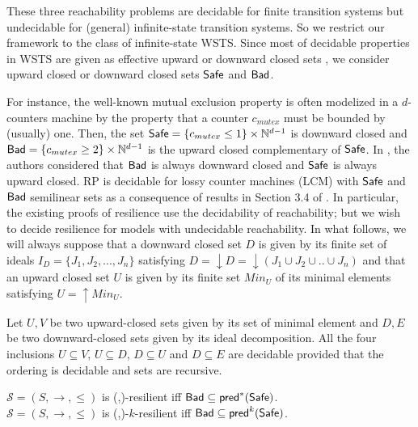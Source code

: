 These three reachability problems are decidable for finite transition systems but undecidable for (general) infinite-state transition systems. 
So we restrict our framework to the class of infinite-state WSTS. Since most of decidable properties in WSTS are given as effective upward or downward closed sets \cite{DBLP:journals/iandc/AbdullaCJT00, DBLP:journals/tcs/FinkelS01}, we consider upward closed or downward closed sets $\textsf{Safe}$ and $\textsf{Bad}$.

For instance, the well-known mutual exclusion property is often modelized in a $d$-counters machine by the property that a counter $c_{mutex}$ must be bounded by (usually) one. Then, the set $\textsf{Safe} =  \{c_{mutex} \leq 1\} \times \mathbb{N}^{d-1}$ is downward closed and $\textsf{Bad} =\{c_{mutex} \geq 2\} \times  \mathbb{N}^{d-1} $ is the upward closed complementary of $\textsf{Safe}$. In \cite{DBLP:conf/gg/Ozkan22}, the authors considered that $\textsf{Bad}$ is always downward closed and $\textsf{Safe}$ is always upward closed.
%		
RP is decidable for lossy counter machines (LCM) with $\textsf{Safe}$ and $\textsf{Bad}$ semilinear sets as a consequence of results in Section 3.4 of \cite{DBLP:conf/rp/Schnoebelen10}. In particular, the existing proofs of resilience use the decidability of reachability; but we wish to decide resilience for models with undecidable reachability.
%
In what follows, we will always suppose that a downward closed set $D$ is given by its finite set of ideals $I_D=\{J_1, J_2,...,J_n\}$ satisfying $D=\downarrow D = \downarrow (J_1 \cup J_2 \cup..\cup J_n)$ and that an upward closed set $U$ is given by its finite set $Min_U$ of its minimal elements satisfying $U=\uparrow Min_U$.

Let $U,V$ be two upward-closed sets given by its set of minimal element and $D,E$ be two downward-closed sets given by its ideal decomposition. All the four  inclusions $U \subseteq V$,  $U \subseteq D$, $D \subseteq U$ and $D \subseteq E$ are decidable provided that the ordering is decidable and sets are recursive.


\begin{proposition}[Reformulation]\label{reformulation}
$\mathscr{S}=(S,\rightarrow,\leq)$ is %
(\Bad,\Safe)-resilient iff $\textsf{Bad} \subseteq \textsf{pred}^*(\textsf{Safe})$.\\
$\mathscr{S}=(S,\rightarrow,\leq)$ is %
(\Bad,\Safe)-$k$-resilient iff $\textsf{Bad} \subseteq \textsf{pred}^k(\textsf{Safe})$.
\end{proposition}


